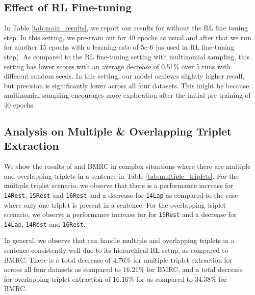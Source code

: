\documentclass[sigconf]{acmart}
\begin{document}
\begin{table}[ht!]
\subsection{Effect of RL Fine-tuning}

In Table \ref{tab:main_results}, we report our results for \mymodel{} without the RL fine tuning step. In this setting, we pre-train our \mymodel{} for 40 epochs as usual and after that we run for another 15 epochs with a learning rate of 5e-6 (as used in RL fine-tuning step). As compared to the RL fine-tuning setting with multinomial sampling, this setting has lower  scores with an average decrease of 0.51\% over 5 runs with different random seeds. In this setting, our model achieves slightly higher recall, but precision is significantly lower across all four datasets. This might be because multinomial sampling encourages more exploration after the initial pre-training of 40 epochs.

\vspace{-1em}
\subsection{Analysis on Multiple \& Overlapping Triplet Extraction}



We show the results of \mymodel{} and BMRC in complex situations where there are multiple and overlapping triplets in a sentence in Table \ref{tab:multiple_triplets}. For the multiple triplet scenario, we observe that there is a performance increase for \texttt{14Rest}, \texttt{15Rest} and \texttt{16Rest} and a decrease for \texttt{14Lap} as compared to the case where only one triplet is present in a sentence. For the overlapping triplet scenario, we observe a performance increase for for \texttt{15Rest} and a decrease for \texttt{14Lap}, \texttt{14Rest} and \texttt{16Rest}.

In general, we observe that \mymodel{} can handle multiple and overlapping triplets in a sentence consistently well due to its hierarchical RL setup, as compared to BMRC. There is a total  decrease of 4.76\% for multiple triplet extraction for \mymodel{} across all four datasets as compared to 16.21\% for BMRC, and a total  decrease for overlapping triplet extraction of 16.16\% for \mymodel{} as compared to 34.38\% for BMRC. 

\vspace{-0.7em}

\end{table}
\end{document}
